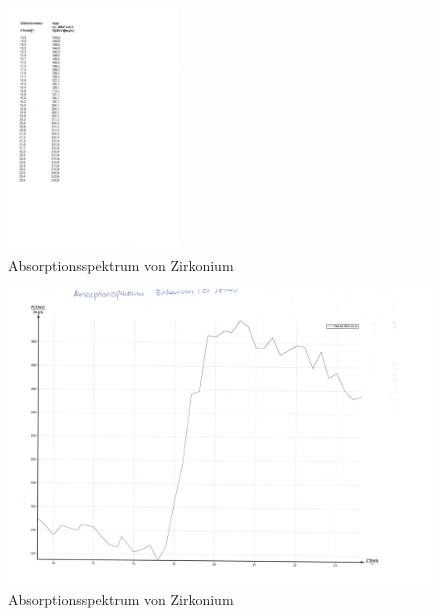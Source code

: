 \begin{figure}[h!]
  \centering
  \includegraphics[width=0.4\textwidth]{zirkoniumtab.pdf}
  \caption{Absorptionsspektrum von Zirkonium}
  \label{tab:zirkonium}
\end{figure}
\begin{figure}[h!]
  \centering
  \includegraphics[width=\textwidth]{zirkoniumgraph.pdf}
  \caption{Absorptionsspektrum von Zirkonium}
  \label{fig:zirkonium}
\end{figure}
\FloatBarrier
